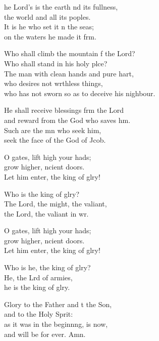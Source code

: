 \settowidth{\versewidth}{who has not sworn so as to deceive his neighbour.}
\begin{psalmverse}%
  \begin{patverse}
    he Lord’s is the earth nd its fullness,\Med\\
    the world and all its poples.\\
It is he who set it n the seas;\Med\\
    on the waters he made it f\pointup{\i}rm.

Who shall climb the mountain f the Lord?\Med\\
    Who shall stand in his holy plce?\\
The man with clean hands and pure hart,\Flex\\
    who desires not wrthless things,\Med\\
    who has not sworn so as to deceive his nighbour.

He shall receive blessings frm the Lord\Med\\
    and reward from the God who saves h\pointup{\i}m.\\
Such are the mn who seek him,\Med\\
    seek the face of the God of Jcob.

O gates, lift high your hads;\Flex\\
    grow higher, ncient doors.\Med\\
    Let him enter, the king of glry!

Who is the king of glry?\Flex\\
    The Lord, the might, the valiant,\Med\\
    the Lord, the valiant in wr.

O gates, lift high your hads;\Flex\\
    grow higher, ncient doors.\Med\\
    Let him enter, the king of glry!

Who is he, the king of glry?\Flex\\
    He, the Lrd of armies,\Med\\
    he is the king of glry.

Glory to the Father and t the Son,\Med\\
    and to the Holy Sp\pointup{\i}rit:\\
as it was in the beginn\pointup{\i}ng, is now,\Med\\
    and will be for ever. Amn.
  \end{patverse}
\end{psalmverse}
